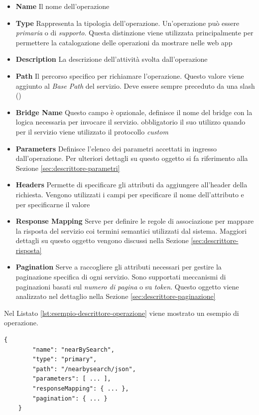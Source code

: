 \begin{itemize}
	\item \textbf{Name} Il nome dell'operazione
	\item \textbf{Type} Rappresenta la tipologia dell'operazione. Un'operazione può essere \emph{primaria} o di \emph{supporto}. Questa distinzione viene utilizzata principalmente per permettere la catalogazione delle operazioni da mostrare nelle web app
	\item \textbf{Description} La descrizione dell'attività svolta dall'operazione
	\item \textbf{Path} Il percorso specifico per richiamare l'operazione. Questo valore viene aggiunto al \emph{Base Path} del servizio. Deve essere sempre preceduto da una slash (\virgolette{/})
	\item \textbf{Bridge Name} Questo campo è opzionale, definisce il nome del bridge con la logica necessaria per invocare il servizio. \upe obbligatorio il suo utilizzo quando per il servizio viene utilizzato il protocollo \emph{custom}
	\item \textbf{Parameters} Definisce l'elenco dei parametri accettati in ingresso dall'operazione. Per ulteriori dettagli su questo oggetto si fa riferimento alla Sezione \ref{sec:descrittore-parametri}
	\item \textbf{Headers} Permette di specificare gli attributi da aggiungere all'header della richiesta. Vengono utilizzati i campi  per specificare il nome dell'attributo e  per specificarne il valore
	\item \textbf{Response Mapping} Serve per definire le regole di associazione per mappare la risposta del servizio coi termini semantici utilizzati dal sistema. Maggiori dettagli su questo oggetto vengono discussi nella Sezione \ref{sec:descrittore-risposta}
	\item \textbf{Pagination} Serve a raccogliere gli attributi necessari per gestire la paginazione specifica di ogni servizio. Sono supportati meccanismi di paginazioni basati sul \emph{numero di pagina} o su \emph{token}. Questo oggetto viene analizzato nel dettaglio nella Sezione \ref{sec:descrittore-paginazione}
\end{itemize}

Nel Listato \ref{lst:esempio-descrittore-operazione} viene mostrato un esempio di operazione.

\begin{lstlisting}[style=blocco-esempi,
								caption=Esempio di operazione,
								label=lst:esempio-descrittore-operazione]
	{
		"name": "nearBySearch",
		"type": "primary",
		"path": "/nearbysearch/json",
		"parameters": [ ... ],
		"responseMapping": { ... },
		"pagination": { ... }
	}
\end{lstlisting}

